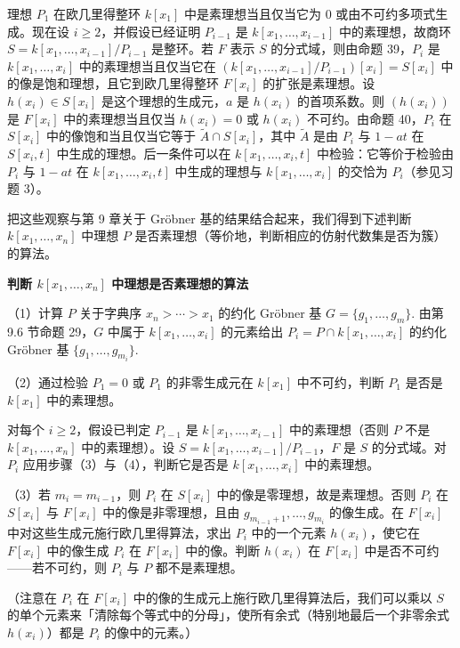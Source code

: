 理想 \(P_1\) 在欧几里得整环 \(k[x_1]\) 中是素理想当且仅当它为 0 或由不可约多项式生成。现在设 \(i \geq 2\)，并假设已经证明 \(P_{i-1}\) 是 \(k[x_1, \ldots, x_{i-1}]\) 中的素理想，故商环 \(S = k[x_1, \ldots, x_{i-1}]/P_{i-1}\) 是整环。若 \(F\) 表示 \(S\) 的分式域，则由命题 39，\(P_i\) 是 \(k[x_1, \ldots, x_i]\) 中的素理想当且仅当它在 \((k[x_1, \ldots, x_{i-1}]/P_{i-1})[x_i] = S[x_i]\) 中的像是饱和理想，且它到欧几里得整环 \(F[x_i]\) 的扩张是素理想。设 \(h(x_i) \in S[x_i]\) 是这个理想的生成元，\(a\) 是 \(h(x_i)\) 的首项系数。则 \((h(x_i))\) 是 \(F[x_i]\) 中的素理想当且仅当 \(h(x_i) = 0\) 或 \(h(x_i)\) 不可约。由命题 40，\(P_i\) 在 \(S[x_i]\) 中的像饱和当且仅当它等于 \(\tilde A \cap S[x_i]\)，其中 \(\tilde A\) 是由 \(P_i\) 与 \(1-at\) 在 \(S[x_i,t]\) 中生成的理想。后一条件可以在 \(k[x_1, \ldots, x_i, t]\) 中检验：它等价于检验由 \(P_i\) 与 \(1-at\) 在 \(k[x_1, \ldots, x_i, t]\) 中生成的理想与 \(k[x_1, \ldots, x_i]\) 的交恰为 \(P_i\)（参见习题 3）。

把这些观察与第 9 章关于 Gröbner 基的结果结合起来，我们得到下述判断 \(k[x_1, \ldots, x_n]\) 中理想 \(P\) 是否素理想（等价地，判断相应的仿射代数集是否为簇）的算法。

\noindent\textbf{判断 \(k[x_1, \ldots, x_n]\) 中理想是否素理想的算法}

（1）计算 \(P\) 关于字典序 \(x_n > \cdots > x_1\) 的约化 Gröbner 基 \(G = \{g_1, \ldots, g_m\}\). 由第 9.6 节命题 29，\(G\) 中属于 \(k[x_1, \ldots, x_i]\) 的元素给出 \(P_i = P \cap k[x_1, \ldots, x_i]\) 的约化 Gröbner 基 \(\{g_1, \ldots, g_{m_i}\}\).

（2）通过检验 \(P_1 = 0\) 或 \(P_1\) 的非零生成元在 \(k[x_1]\) 中不可约，判断 \(P_1\) 是否是 \(k[x_1]\) 中的素理想。

对每个 \(i \geq 2\)，假设已判定 \(P_{i-1}\) 是 \(k[x_1, \ldots, x_{i-1}]\) 中的素理想（否则 \(P\) 不是 \(k[x_1, \ldots, x_n]\) 中的素理想）。设 \(S = k[x_1, \ldots, x_{i-1}]/P_{i-1}\)，\(F\) 是 \(S\) 的分式域。对 \(P_i\) 应用步骤（3）与（4），判断它是否是 \(k[x_1, \ldots, x_i]\) 中的素理想。

（3）若 \(m_i = m_{i-1}\)，则 \(P_i\) 在 \(S[x_i]\) 中的像是零理想，故是素理想。否则 \(P_i\) 在 \(S[x_i]\) 与 \(F[x_i]\) 中的像是非零理想，且由 \(g_{m_{i-1}+1}, \ldots, g_{m_i}\) 的像生成。在 \(F[x_i]\) 中对这些生成元施行欧几里得算法，求出 \(P_i\) 中的一个元素 \(h(x_i)\)，使它在 \(F[x_i]\) 中的像生成 \(P_i\) 在 \(F[x_i]\) 中的像。判断 \(h(x_i)\) 在 \(F[x_i]\) 中是否不可约——若不可约，则 \(P_i\) 与 \(P\) 都不是素理想。

（注意在 \(P_i\) 在 \(F[x_i]\) 中的像的生成元上施行欧几里得算法后，我们可以乘以 \(S\) 的单个元素来「清除每个等式中的分母」，使所有余式（特别地最后一个非零余式 \(h(x_i)\)）都是 \(P_i\) 的像中的元素。）

